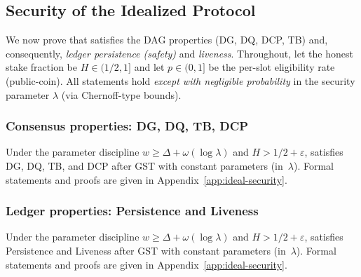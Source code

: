 \subsection{Security of the Idealized Protocol}
\label{subsec:ideal-security}
We now prove that \ProjIdeal satisfies the DAG properties (DG, DQ, DCP, TB) and, consequently, \emph{ledger persistence (safety)} and \emph{liveness}. Throughout, let the honest stake fraction be $H\in(1/2,1]$ and let $p\in(0,1]$ be the per-slot eligibility rate (public-coin). All statements hold \emph{except with negligible probability} in the security parameter $\lambda$ (via Chernoff-type bounds).



\subsubsection{Consensus properties: DG, DQ, TB, DCP}
\begin{theorem}\label{thm:ideal-consensus-summary}
Under the parameter discipline $w \ge \Delta + \omega(\log \lambda)$ and $H>1/2+\varepsilon$,
\ProjIdeal{} satisfies DG, DQ, TB, and DCP after GST with constant parameters (in~$\lambda$).
Formal statements and proofs are given in Appendix~\ref{app:ideal-security}.
\end{theorem}

\subsubsection{Ledger properties: Persistence and Liveness}

\begin{theorem}\label{thm:ideal-ledger-summary}
Under the parameter discipline $w \ge \Delta + \omega(\log \lambda)$ and $H>1/2+\varepsilon$,
\ProjIdeal{} satisfies Persistence and Liveness after GST with constant parameters (in~$\lambda$).
Formal statements and proofs are given in Appendix~\ref{app:ideal-security}.
\end{theorem}




